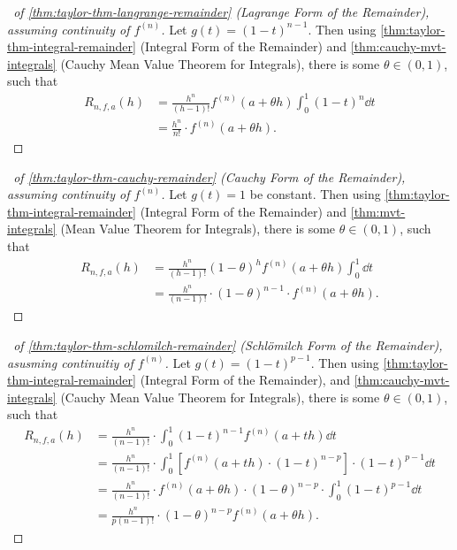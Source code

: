 \documentclass[11pt]{article}
\numberwithin{equation}{section}
\theoremstyle{definition}
\theoremstyle{remark}
\newcommand{\pqty}[1]{\left(#1\right)}
\newcommand{\bqty}[1]{\left[#1\right]}
\newcommand{\oointv}[2]{(#1,#2)}
\begin{document}
\begin{proof}[\proofname\ of \autoref{thm:taylor-thm-langrange-remainder} (Lagrange Form of the Remainder), assuming continuity of \(f^{\pqty{n}}\)]
    Let \(g\pqty{t} = \pqty{1 - t}^{n - 1}\). Then using \autoref{thm:taylor-thm-integral-remainder} (Integral Form of the Remainder) and \autoref{thm:cauchy-mvt-integrals} (Cauchy Mean Value Theorem for Integrals), there is some \(\theta \in \oointv{0}{1}\), such that
    \begin{align*}
        R_{n, f, a} \pqty{h} &= \frac{h^n}{\pqty{h - 1}!} f^{\pqty{n}} \pqty{a + \theta h} \int_{0}^{1} \pqty{1 - t}^n \dd{t} \\
        &= \frac{h^n}{n!} \cdot f^{\pqty{n}} \pqty{a + \theta h}.
    \end{align*}
\end{proof}

\begin{proof}[\proofname\ of \autoref{thm:taylor-thm-cauchy-remainder} (Cauchy Form of the Remainder), assuming continuity of \(f^{\pqty{n}}\)]
    Let \(g\pqty{t} = 1\) be constant. Then using \autoref{thm:taylor-thm-integral-remainder} (Integral Form of the Remainder) and \autoref{thm:mvt-integrals} (Mean Value Theorem for Integrals), there is some \(\theta \in \oointv{0}{1}\), such that
    \begin{align*}
        R_{n, f, a} \pqty{h} &= \frac{h^n}{\pqty{h - 1}!} \pqty{1 - \theta}^{h} f^{\pqty{n}} \pqty{a + \theta h} \int_{0}^{1} \dd{t} \\
        &= \frac{h^n}{\pqty{n - 1}!} \cdot \pqty{1 - \theta}^{n - 1} \cdot f^{\pqty{n}} \pqty{a + \theta h}.
    \end{align*}
\end{proof}

\begin{proof}[\proofname\ of \autoref{thm:taylor-thm-schlomilch-remainder} (Schl\"{o}milch Form of the Remainder), asusming continuitiy of \(f^{\pqty{n}}\)]
    Let \(g\pqty{t} = \pqty{1 - t}^{p - 1}\). Then using \autoref{thm:taylor-thm-integral-remainder} (Integral Form of the Remainder), and \autoref{thm:cauchy-mvt-integrals} (Cauchy Mean Value Theorem for Integrals), there is some \(\theta \in \oointv{0}{1}\), such that
    \begin{align*}
        R_{n, f, a} \pqty{h} &= \frac{h^n}{\pqty{n - 1}!} \cdot \int_{0}^{1} \pqty{1 - t}^{n - 1} f^{\pqty{n}} \pqty{a + th} \dd{t} \\
        &= \frac{h^n}{\pqty{n - 1}!} \cdot \int_{0}^{1} \bqty{f^{\pqty{n}} \pqty{a + th} \cdot \pqty{1 - t}^{n - p}} \cdot \pqty{1 - t}^{p - 1} \dd{t} \\
        &= \frac{h^n}{\pqty{n - 1}!} \cdot f^{\pqty{n}} \pqty{a + \theta h} \cdot \pqty{1 - \theta}^{n - p} \cdot \int_{0}^{1} \pqty{1 - t}^{p - 1} \dd{t} \\
        &= \frac{h^n}{p \pqty{n - 1}!} \cdot \pqty{1 - \theta}^{n - p} f^{\pqty{n}} \pqty{a + \theta h}.
    \end{align*}
\end{proof}
\end{document}

